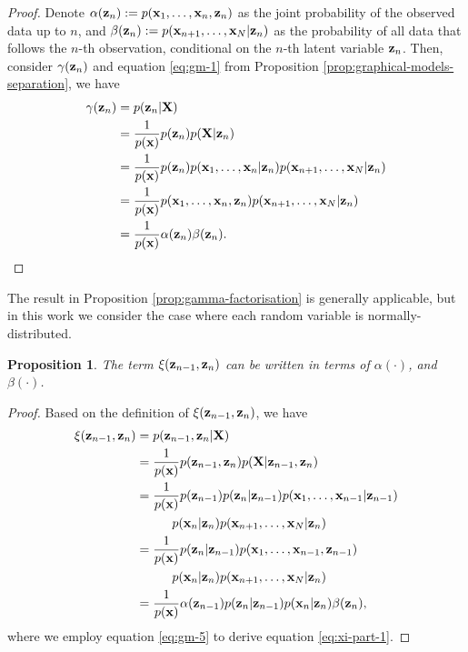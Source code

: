 \documentclass[12pt, oneside]{book}
\numberwithin{equation}{section}
\newcommand{\x}{{\bf x}}
\newcommand{\X}{{\bf X}}
\newcommand{\z}{{\bf z}}
\newtheorem{proposition}{Proposition}[section]
\begin{document}
{\begin{proof}
Denote $\alpha(\z_n) := p(\x_1, \ldots, \x_n, \z_n)$ as the joint probability of the observed data up to $n$, and $\beta(\z_n) := p(\x_{n+1}, \ldots, \x_N\vert \z_n)$ as the probability of all data that follows the $n$-th observation, conditional on the $n$-th latent variable $\z_n$. Then, consider  $\gamma(\z_n)$ and equation \eqref{eq:gm-1} from Proposition \ref{prop:graphical-models-separation}, we have
\begin{align}
	\gamma(\z_n) &= p(\z_n \vert {\bf X})\\
					  &= \frac{1}{p(\x)}p(\z_n)p({\bf X} \vert \z_n)\\
					  &= \frac{1}{p(\x)} p(\z_n) p(\x_1, \ldots, \x_n\vert \z_n) p(\x_{n+1}, \ldots, \x_N\vert \z_n) \label{eq:gamma-part-1}\\
					  &= \frac{1}{p(\x)}p(\x_1, \ldots, \x_n, \z_n) p(\x_{n+1}, \ldots, \x_N\vert \z_n)\\
					  &= \frac{1}{p(\x)}\alpha(\z_n)\beta(\z_n).
\end{align}
\end{proof}

The result in Proposition \ref{prop:gamma-factorisation} is generally applicable, but in this work we consider the case where each random variable is normally-distributed.

\begin{proposition}\label{prop:xi-factorisation}
	The term $\xi(\z_{n-1}, \z_n)$ can be written in terms of $\alpha({\cdot})$, and $\beta(\cdot)$.
\end{proposition}

\begin{proof}
	Based on the definition of $\xi(\z_{n-1}, \z_{n})$, we have
	\begin{align}
		\xi(\z_{n-1}, \z_{n}) &= p(\z_{n-1}, \z_{n} \vert \X)\\
		&= \frac{1}{p(\x)}p(\z_{n-1}, \z_{n}) p(\X \vert \z_{n-1}, \z_{n})\\
		&= \frac{1}{p(\x)} p(\z_{n-1}) p(\z_{n} \vert \z_{n-1}) p(\x_1, \ldots, \x_{n-1}\vert \z_{n-1}) \nonumber \\
			&\hspace{1cm} p(\x_n\vert \z_n) p(\x_{n+1}, \ldots, \x_N \vert \z_n) \label{eq:xi-part-1}\\
		&= \frac{1}{p(\x)} p(\z_{n} \vert \z_{n-1}) p(\x_1, \ldots, \x_{n-1}, \z_{n-1}) \nonumber \\
			&\hspace{1cm} p(\x_n\vert \z_n) p(\x_{n+1}, \ldots, \x_N \vert \z_n)\\
		&= \frac{1}{p(\x)} \alpha(\z_{n-1}) p(\z_{n} \vert \z_{n-1}) p(\x_n \vert \z_n) \beta(\z_n),
	\end{align}
where we employ equation \eqref{eq:gm-5} to derive equation \eqref{eq:xi-part-1}.
\end{proof}


}
\end{document}
